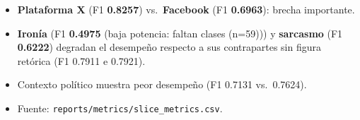 \begin{itemize}[leftmargin=*]
  \item \textbf{Plataforma X} (F1 \textbf{0.8257}) vs.\ \textbf{Facebook} (F1 \textbf{0.6963}): brecha importante.
  \item \textbf{Ironía} (F1 \textbf{0.4975} (baja potencia: faltan clases (n=59))) y \textbf{sarcasmo} (F1 \textbf{0.6222}) degradan el desempeño respecto a sus contrapartes sin figura retórica (F1 0.7911 e 0.7921).
  \item Contexto político muestra peor desempeño (F1 0.7131 vs.\ 0.7624).
  \item Fuente: \texttt{reports/metrics/slice\_metrics.csv}.
\end{itemize}
